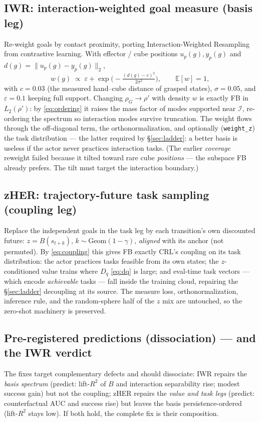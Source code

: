 \documentclass[11pt,a4paper]{article}
\newcommand{\E}{\mathbb{E}}
\begin{document}
\subsection{IWR: interaction-weighted goal measure (basis leg)}
Re-weight goals by contact proximity, porting Interaction-Weighted Resampling from contrastive
learning. With effector / cube positions $u_p(g),y_p(g)$ and $d(g)=\|u_p(g)-y_p(g)\|_2$,
\begin{equation}
w(g)\;\propto\;\varepsilon+\exp\!\Big(-\tfrac{(d(g)-c)^{2}}{2\sigma^{2}}\Big),\qquad \E[w]=1,
\label{eq:iwr}
\end{equation}
with $c=0.03$ (the measured hand--cube distance of grasped states), $\sigma=0.05$, and
$\varepsilon=0.1$ keeping full support. Changing $\rho_G\to\rho'$ with density $w$ is exactly FB in
$L_2(\rho')$: by \eqref{eq:ordering} it raises the mass factor of modes supported near
$\mathcal{I}$, re-ordering the spectrum so interaction modes survive truncation. The weight flows
through the off-diagonal term, the orthonormalization, and optionally (\texttt{weight\_z}) the
task distribution --- the latter required by \S\ref{sec:ladder}: a better basis is useless if the
actor never practices interaction tasks. (The earlier \emph{coverage} reweight failed because it
tilted toward rare cube \emph{positions} --- the subspace FB already prefers. The tilt must target
the interaction boundary.)

\subsection{zHER: trajectory-future task sampling (coupling leg)}
Replace the independent goals in the task leg by each transition's own discounted future:
$z=B(s_{t+k})$, $k\sim\mathrm{Geom}(1-\gamma)$, \emph{aligned} with its anchor (not permuted). By
\eqref{eq:coupling} this gives FB exactly CRL's coupling on its task distribution: the actor
practices tasks feasible from its own states; the $z$-conditioned value trains where $D_q$
\eqref{eq:dq} is large; and eval-time task vectors --- which encode \emph{achievable} tasks ---
fall inside the training cloud, repairing the \S\ref{sec:ladder} decoupling at its source. The
measure loss, orthonormalization, inference rule, and the random-sphere half of the $z$ mix are
untouched, so the zero-shot machinery is preserved.

\subsection{Pre-registered predictions (dissociation) --- and the IWR verdict}
The fixes target complementary defects and should dissociate: IWR repairs the \emph{basis
spectrum} (predict: lift-$R^{2}$ of $B$ and interaction separability rise; modest success gain)
but not the coupling; zHER repairs the \emph{value and task legs} (predict: counterfactual AUC and
success rise) but leaves the basis persistence-ordered (lift-$R^{2}$ stays low). If both hold, the
complete fix is their composition.
\end{document}

